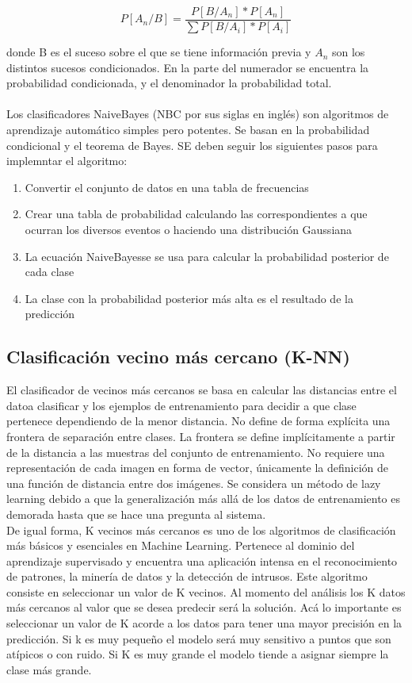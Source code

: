 \documentclass[conference]{IEEEtran}
\begin{document}
\begin{equation}
P[A_n/B]= \frac{P[B/A_n]*P[A_n]}{\sum P[B/A_i]*P[A_i]}
\end{equation}

donde B es el suceso sobre el que se tiene información previa y $A_n$ son los distintos sucesos condicionados. En la parte del numerador se encuentra la probabilidad condicionada, y el denominador la probabilidad total. \\
\\
Los clasificadores NaiveBayes (NBC por sus siglas en inglés) son algoritmos de aprendizaje automático simples pero potentes. Se basan en la probabilidad condicional y el teorema de Bayes. SE deben seguir los siguientes pasos para implemntar el algoritmo: 
\begin{enumerate}
\item Convertir el conjunto de datos en una tabla de frecuencias
\item Crear una tabla de probabilidad calculando las correspondientes a que ocurran los diversos eventos o haciendo una distribución Gaussiana
\item La ecuación NaiveBayesse se usa para calcular la probabilidad posterior de cada clase
\item La clase con la probabilidad posterior más alta es el resultado de la predicción
\end{enumerate}

\subsection{Clasificación vecino más cercano (K-NN)}
El clasificador de vecinos más cercanos se basa en calcular las distancias entre el datoa  clasificar y los ejemplos de entrenamiento para decidir a que clase pertenece dependiendo de la menor distancia. No define de forma explícita una frontera de separación entre clases. La frontera se define implícitamente a partir de la distancia a las muestras del conjunto de entrenamiento. No requiere una representación de cada imagen en forma de vector, únicamente la definición de una función de distancia entre dos imágenes. Se considera un método de lazy learning debido a que la generalización más allá de los datos de entrenamiento es demorada hasta que se hace una pregunta al sistema.\\

De igual forma, K vecinos más cercanos es uno de los algoritmos de clasificación más básicos y esenciales en Machine Learning. Pertenece al dominio del aprendizaje supervisado y encuentra una aplicación intensa en el reconocimiento de patrones, la minería de datos y la detección de intrusos. Este algoritmo consiste en seleccionar un valor de K vecinos. Al momento del análisis los K datos más cercanos al valor que se desea predecir será la solución. Acá lo importante es seleccionar un valor de K acorde a los datos para tener una mayor precisión en la predicción. Si k es muy pequeño el modelo será muy sensitivo a puntos que son atípicos o con ruido. Si K es muy grande el modelo tiende a asignar siempre la clase más grande.
\end{document}
